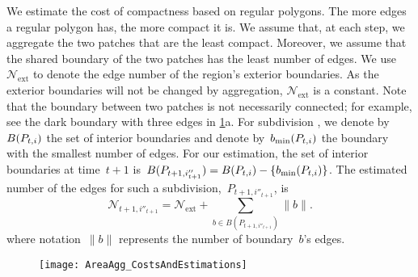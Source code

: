 We estimate the cost of compactness based on regular polygons.
The more edges a regular polygon has, the more compact it is.
We assume that, at each step, 
we aggregate the two patches that are the least compact.
Moreover, we assume that the shared boundary of the two patches  
has the least number of edges.
We use $\mathcal{N}_\mathrm{ext}$ to 
denote the edge number of the region's exterior boundaries.
As the exterior boundaries will not be changed by aggregation, 
$\mathcal{N}_\mathrm{ext}$ 
is a constant. 
%
Note that the boundary between two patches 
is not necessarily connected; 
for example, see the dark boundary with three edges 
in \fig\ref{fig:AreaAgg_h_comp}a.
For subdivision \Pnode,
we denote by~$B(P_{t,i})$ the set of interior boundaries 
and denote by~$b_\mathrm{min}(P_{t,i})$ 
the boundary with the smallest number of edges.
For our estimation, the set of interior boundaries 
at time~$t+1$ 
is~$B(P_{t+1,i''_{t+1}})= B(P_{t,i})-{\{b_\mathrm{min}(P_{t,i})\}}$. 
The estimated number of the edges for 
such a subdivision,~$P_{t+1,i''_{t+1}}$, is
\begin{equation}
\label{eq:LeftEdgeNum}
\mathcal{N}_{t+1,i''_{t+1}}=
\mathcal{N}_\mathrm{ext} + \sum_{b \in B(P_{t+1,i''_{t+1}})} \|b\|.
\end{equation}
where notation~$\|b\|$ represents the number of boundary~$b$'s edges.

\begin{figure*}[tb]
\centering
\texttt{[image: AreaAgg\_CostsAndEstimations]}
\label{fig:AreaAgg_h_comp}
\end{figure*}

